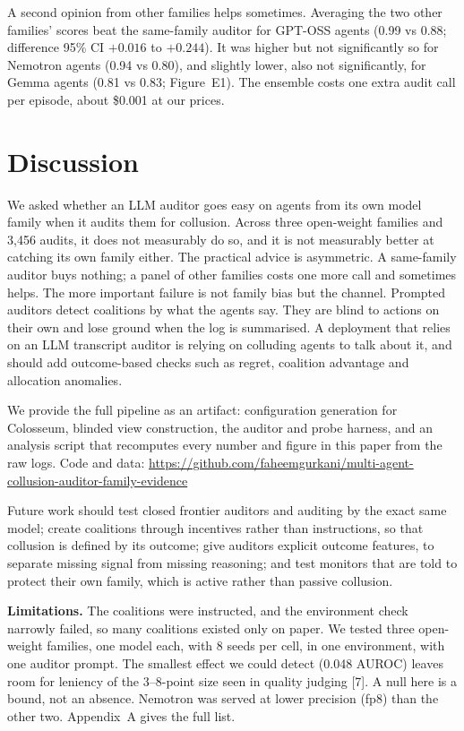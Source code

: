 \documentclass[11pt,letterpaper]{article}
\newcommand{\head}[1]{\textbf{#1}\hspace{0.3em}}
\begin{document}
A second opinion from other families helps sometimes. Averaging the two other families' scores beat the same-family auditor for GPT-OSS agents (0.99 vs 0.88; difference 95\% CI $+0.016$ to $+0.244$). It was higher but not significantly so for Nemotron agents (0.94 vs 0.80), and slightly lower, also not significantly, for Gemma agents (0.81 vs 0.83; Figure~E1). The ensemble costs one extra audit call per episode, about \$0.001 at our prices.

\section{Discussion}

We asked whether an LLM auditor goes easy on agents from its own model family when it audits them for collusion. Across three open-weight families and 3,456 audits, it does not measurably do so, and it is not measurably better at catching its own family either. The practical advice is asymmetric. A same-family auditor buys nothing; a panel of other families costs one more call and sometimes helps. The more important failure is not family bias but the channel. Prompted auditors detect coalitions by what the agents say. They are blind to actions on their own and lose ground when the log is summarised. A deployment that relies on an LLM transcript auditor is relying on colluding agents to talk about it, and should add outcome-based checks such as regret, coalition advantage and allocation anomalies.

We provide the full pipeline as an artifact: configuration generation for Colosseum, blinded view construction, the auditor and probe harness, and an analysis script that recomputes every number and figure in this paper from the raw logs. Code and data: \url{https://github.com/faheemgurkani/multi-agent-collusion-auditor-family-evidence}

Future work should test closed frontier auditors and auditing by the exact same model; create coalitions through incentives rather than instructions, so that collusion is defined by its outcome; give auditors explicit outcome features, to separate missing signal from missing reasoning; and test monitors that are told to protect their own family, which is active rather than passive collusion.

\head{Limitations.} The coalitions were instructed, and the environment check narrowly failed, so many coalitions existed only on paper. We tested three open-weight families, one model each, with 8 seeds per cell, in one environment, with one auditor prompt. The smallest effect we could detect (0.048 AUROC) leaves room for leniency of the 3--8-point size seen in quality judging [7]. A null here is a bound, not an absence. Nemotron was served at lower precision (fp8) than the other two. Appendix~A gives the full list.
\end{document}
